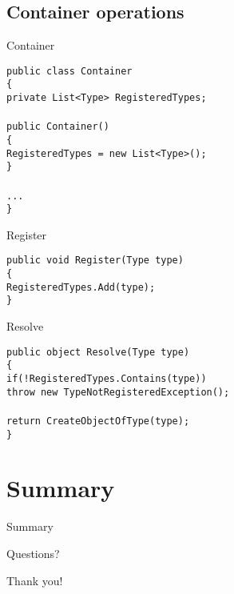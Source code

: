 \documentclass{beamer}
\newcommand{\code}[1]{{\texttt{#1}}}
\begin{document}
\subsection*{Container operations}

\begin{frame}{Container}
     \begin{large}
	\code{public class Container}\\
	\code{\{}\\ \quad
		\code{private List<Type> RegisteredTypes;}\\ \quad
		\code{}\\ \quad
		\code{public Container()}\\ \quad
		\code{\{}\\ \qquad
		\code{RegisteredTypes = new List<Type>();}\\ \quad
		\code{\}}\\  \quad
		\code{}\\ \quad
		\code{...}\\
	\code{\}}
     \end{large}
\end{frame}

\begin{frame}{Register}
     \begin{large}
	\code{public void Register(Type type)}\\
	\code{\{}\\ \quad
		\code{RegisteredTypes.Add(type);}\\
	\code{\}}
     \end{large}
\end{frame}

\begin{frame}{Resolve}
     \begin{large}
	\code{public object Resolve(Type type)}\\
	\code{\{}\\ \quad
		\code{if(!RegisteredTypes.Contains(type))}\\ \qquad
		\code{throw new TypeNotRegisteredException();}\\ \quad
		\code{}\\ \quad
		\code{return CreateObjectOfType(type);}\\
	\code{\}}
     \end{large}
\end{frame}

\section{Summary}

\begin{frame}{}
	\begin{center}
		\Huge{Summary}
	\end{center}
\end{frame}

\begin{frame}{Questions?}
	\begin{center}
		\Huge{Thank you!}
	\end{center}
\end{frame}
\end{document}
